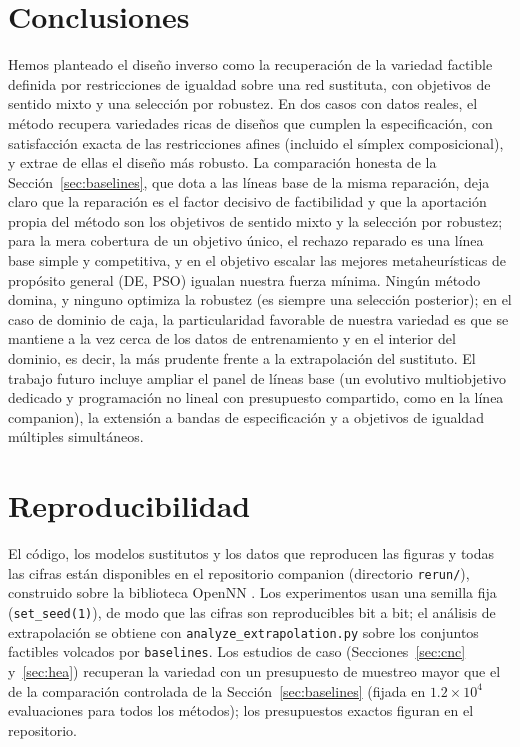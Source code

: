 \documentclass[5p,times,authoryear]{elsarticle}
\begin{document}
\section{Conclusiones}
\label{sec:conclusiones}
Hemos planteado el diseño inverso como la recuperación de la variedad factible
definida por restricciones de igualdad sobre una red sustituta, con objetivos de
sentido mixto y una selección por robustez. En dos casos con datos reales, el
método recupera variedades ricas de diseños que cumplen la especificación, con
satisfacción exacta de las restricciones afines (incluido el símplex
composicional), y extrae de ellas el diseño más robusto. La comparación honesta
de la Sección~\ref{sec:baselines}, que dota a las líneas base de la misma
reparación, deja claro que la reparación es el factor decisivo de factibilidad y
que la aportación propia del método son los objetivos de sentido mixto y la
selección por robustez; para la mera cobertura de un objetivo único, el rechazo
reparado es una línea base simple y competitiva, y en el objetivo escalar las mejores
metaheurísticas de propósito general (DE, PSO) igualan nuestra fuerza mínima. Ningún
método domina, y ninguno optimiza la robustez (es siempre una selección posterior); en
el caso de dominio de caja, la particularidad favorable de nuestra variedad es que se
mantiene a la vez cerca de los datos de entrenamiento y en el interior del dominio, es
decir, la más prudente frente a la extrapolación del sustituto. El trabajo futuro incluye
ampliar el panel de líneas base (un evolutivo multiobjetivo dedicado y programación no
lineal con presupuesto compartido, como en la línea companion), la extensión a bandas de
especificación y a objetivos de igualdad múltiples simultáneos.

\section*{Reproducibilidad}
El código, los modelos sustitutos y los datos que reproducen las figuras y
todas las cifras están disponibles en el repositorio companion (directorio
\texttt{rerun/}), construido sobre la biblioteca OpenNN \citep{opennn}. Los experimentos usan una
semilla fija (\texttt{set\_seed(1)}), de modo que las cifras son reproducibles bit a bit;
el análisis de extrapolación se obtiene con \texttt{analyze\_extrapolation.py} sobre los
conjuntos factibles volcados por \texttt{baselines}. Los estudios de caso (Secciones~\ref{sec:cnc}
y~\ref{sec:hea}) recuperan la variedad con un presupuesto de muestreo mayor que el de la
comparación controlada de la Sección~\ref{sec:baselines} (fijada en $1.2\times10^4$
evaluaciones para todos los métodos); los presupuestos exactos figuran en el repositorio.
\end{document}
